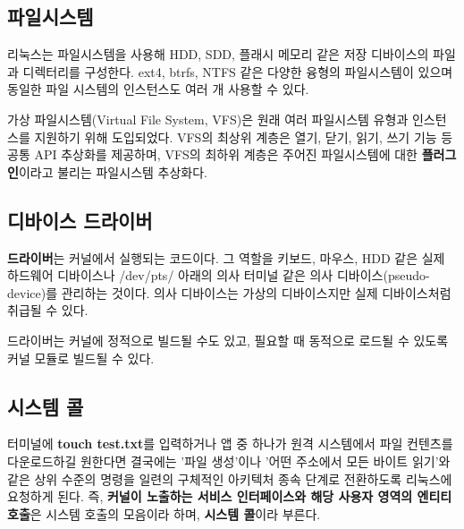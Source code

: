 \subsection{파일시스템}
\begin{flushleft}
    리눅스는 파일시스템을 사용해 HDD, SDD, 플래시 메모리 같은 
    저장 디바이스의 파일과 디렉터리를 구성한다. 
    ext4, btrfs, NTFS 같은 다양한 융형의 파일시스템이 있으며 
    동일한 파일 시스템의 인스턴스도 여러 개 사용할 수 있다.
\end{flushleft}
\begin{flushleft}
    가상 파일시스템(Virtual File System, VFS)은 원래 여러 파일시스템 유형과 인스턴스를 지원하기 위해 도입되었다.
    VFS의 최상위 계층은 열기, 닫기, 읽기, 쓰기 기능 등 공통 API 추상화를 제공하며, 
    VFS의 최하위 계층은 주어진 파일시스템에 대한 \textbf{플러그인}이라고 불리는 파일시스템 추상화다.
\end{flushleft}

\subsection{디바이스 드라이버}
\begin{flushleft}
    \textbf{드라이버}는 커널에서 실행되는 코드이다.
    그 역할을 키보드, 마우스, HDD 같은 실제 하드웨어 디바이스나
    /dev/pts/ 아래의 의사 터미널 같은 의사 디바이스(pseudo-device)를 관리하는 것이다.
    의사 디바이스는 가상의 디바이스지만 실제 디바이스처럼 취급될 수 있다.
\end{flushleft}

\begin{flushleft}
    드라이버는 커널에 정적으로 빌드될 수도 있고,
    필요할 때 동적으로 로드될 수 있도록 커널 모듈로 빌드될 수 있다.
\end{flushleft}
\newpage


\subsection{시스템 콜}
\begin{flushleft}
    터미널에 \textbf{touch test.txt}를 입력하거나
    앱 중 하나가 원격 시스템에서 파일 컨텐츠를 다운로드하길 원한다면
    결국에는 '파일 생성'이나 '어떤 주소에서 모든 바이트 읽기'와 같은 상위 수준의 명령을
    일련의 구체적인 아키텍처 종속 단계로 전환하도록 리눅스에 요청하게 된다.
    즉, \textbf{커널이 노출하는 서비스 인터페이스와 해당 사용자 영역의 엔티티 호출}은
    시스템 호출의 모음이라 하며, \textbf{시스템 콜}이라 부른다.
\end{flushleft}

